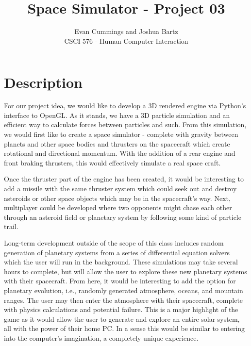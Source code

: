 
\DeclareMathOperator*{\argmax}{arg\,max}


\small

\title{Space Simulator - Project 03}
\author{Evan Cummings and Joshua Bartz\\
CSCI 576 - Human Computer Interaction}

\maketitle

\section*{Description}

For our project idea, we would like to develop a 3D rendered engine via Python's interface to OpenGL.  As it stands, we have a 3D particle simulation and an efficient way to calculate forces between particles and such.  From this simulation, we would first like to create a space simulator - complete with gravity between planets and other space bodies and thrusters on the spacecraft which create rotational and directional momentum.  With the addition of a rear engine and front braking thrusters, this would effectively simulate a real space craft.  

Once the thruster part of the engine has been created, it would be interesting to add a missile with the same thruster system which could seek out and destroy asteroids or other space objects which may be in the spacecraft's way.  Next, multiplayer could be developed where two opponents might chase each other through an asteroid field or planetary system by following some kind of particle trail.  

Long-term development outside of the scope of this class includes random generation of planetary systems from a series of differential equation solvers which the user will run in the background.  These simulations may take several hours to complete, but will allow the user to explore these new planetary systems with their spacecraft.  From here, it would be interesting to add the option for planetary evolution, i.e., randomly generated atmosphere, oceans, and mountain ranges.  The user may then enter the atmosphere with their spacecraft, complete with physics calculations and potential failure.  This is a major highlight of the game as it would allow the user to generate and explore an entire solar system, all with the power of their home PC.  In a sense this would be similar to entering into the computer's imagination, a completely unique experience.

